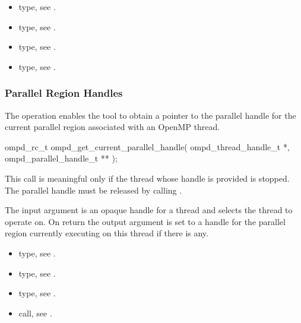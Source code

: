 \crossreferences
\begin{itemize}
  \item {} type, see .
	\item {} type, see .
	\item {} type, see .
	\item {} type, see .
\end{itemize}

\subsubsection{Parallel Region Handles}

\label{subsubsubsec:ompd_get_current_parallel_handle}
\summary
The   operation enables the tool to obtain a pointer to
the parallel handle for the current parallel region associated with an OpenMP thread.

\format

\begin{cspecific}
\begin{ompSyntax}
ompd_rc_t ompd_get_current_parallel_handle(
  ompd_thread_handle_t *,
  ompd_parallel_handle_t **
);
\end{ompSyntax}
\end{cspecific}


\descr
This call is meaningful only if the thread whose handle is provided is stopped. The parallel handle
must be released by calling .

\argdesc
The input argument  is an opaque handle for a thread and selects the thread to operate on.
On return the output argument  is set to a handle for the parallel region
currently executing on this thread if there is any.

\crossreferences
\begin{itemize}
	\item {} type, see .
	\item {} type, see .
	\item {} type, see .
	\item {} call, see .
\end{itemize}

